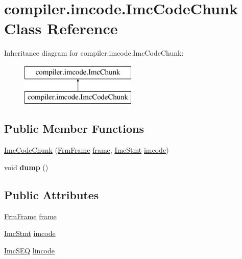 \hypertarget{classcompiler_1_1imcode_1_1_imc_code_chunk}{}\section{compiler.\+imcode.\+Imc\+Code\+Chunk Class Reference}
\label{classcompiler_1_1imcode_1_1_imc_code_chunk}
Inheritance diagram for compiler.\+imcode.\+Imc\+Code\+Chunk\+:\begin{figure}[H]
\begin{center}
\leavevmode
\includegraphics[height=2.000000cm]{classcompiler_1_1imcode_1_1_imc_code_chunk}
\end{center}
\end{figure}
\subsection*{Public Member Functions}
\begin{DoxyCompactItemize}
\item 
\hyperlink{classcompiler_1_1imcode_1_1_imc_code_chunk_a8245b30d5f97a969ad274dd4071a6988}{Imc\+Code\+Chunk} (\hyperlink{classcompiler_1_1frames_1_1_frm_frame}{Frm\+Frame} \hyperlink{classcompiler_1_1imcode_1_1_imc_code_chunk_a91523ee46e370e198d47b6626519dc06}{frame}, \hyperlink{classcompiler_1_1imcode_1_1_imc_stmt}{Imc\+Stmt} \hyperlink{classcompiler_1_1imcode_1_1_imc_code_chunk_a1e1578acaa5c36be5926b3c4391b7b98}{imcode})
\item 
\mbox{\label{classcompiler_1_1imcode_1_1_imc_code_chunk_a69a25284d8377d8f4bc90cb1de140bc4}} 
void {\bfseries dump} ()
\end{DoxyCompactItemize}
\subsection*{Public Attributes}
\begin{DoxyCompactItemize}
\item 
\hyperlink{classcompiler_1_1frames_1_1_frm_frame}{Frm\+Frame} \hyperlink{classcompiler_1_1imcode_1_1_imc_code_chunk_a91523ee46e370e198d47b6626519dc06}{frame}
\item 
\hyperlink{classcompiler_1_1imcode_1_1_imc_stmt}{Imc\+Stmt} \hyperlink{classcompiler_1_1imcode_1_1_imc_code_chunk_a1e1578acaa5c36be5926b3c4391b7b98}{imcode}
\item 
\hyperlink{classcompiler_1_1imcode_1_1_imc_s_e_q}{Imc\+S\+EQ} \hyperlink{classcompiler_1_1imcode_1_1_imc_code_chunk_ad5ec7a53e668d5a7dc3b79a979c748f5}{lincode}
\end{DoxyCompactItemize}


